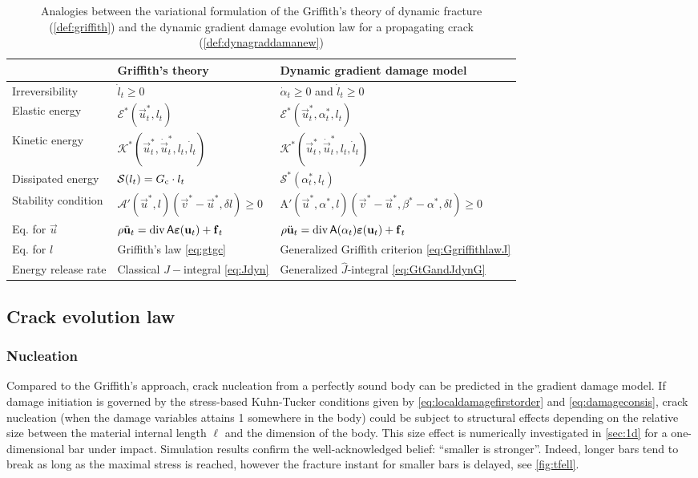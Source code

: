 \begin{table}[htbp]
\caption{Analogies between the variational formulation of the Griffith's theory of dynamic fracture (\cref{def:griffith}) and the dynamic gradient damage evolution law for a propagating crack (\cref{def:dynagraddamanew})} \label{tab:analogy}
\centering
\begin{tabular}{lll} \toprule
 & Griffith's theory & Dynamic gradient damage model \\ \midrule
Irreversibility & $\dot{l}_t\geq 0$ & $\dot{\alpha}_t\geq 0$ and $\dot{l}_t\geq 0$ \\
Elastic energy & $\mathcal{E}^*(\vec{u}^*_t,l_t)$ & $\mathcal{E}^*(\vec{u}^*_t,\alpha^*_t,l_t)$ \\
Kinetic energy & $\mathcal{K}^*(\vec{u}_t^*,\dot{\vec{u}}_t^*,l_t,\dot{l}_t)$ & $\mathcal{K}^*(\vec{u}_t^*,\dot{\vec{u}}_t^*,l_t,\dot{l}_t)$ \\
Dissipated energy & $\mathcal{S}(l_t)=G_\mathrm{c}\cdot l_t$ & $\mathcal{S}^*(\alpha^*_t,l_t)$ \\
Stability condition & $\mathcal{A}'(\vec{u}^*,l)(\vec{v}^*-\vec{u}^*,\delta l)\geq 0$ & $\mathrm{A}'(\vec{u}^*,\alpha^*,l)(\vec{v}^*-\vec{u}^*,\beta^*-\alpha^*,\delta l)\geq 0$ \\
Eq. for $\vec{u}$ & $\rho\ddot{\vec{u}}_t=\div\tens{A}\eps(\vec{u}_t)+\vec{f}_t$ & $\rho\ddot{\vec{u}}_t=\div\tens{A}(\alpha_t)\eps(\vec{u}_t)+\vec{f}_t$ \\
Eq. for $l$ & Griffith's law \eqref{eq:gtgc} & Generalized Griffith criterion \eqref{eq:GgriffithlawJ} \\
Energy release rate & Classical $J-$integral \eqref{eq:Jdyn} & Generalized $\widehat{J}$-integral \eqref{eq:GtGandJdynG} \\ \bottomrule
\end{tabular}
\end{table}

\subsection{Crack evolution law} \label{sec:phases}
\subsubsection{Nucleation}
Compared to the Griffith's approach, crack nucleation from a perfectly sound body can be predicted in the gradient damage model. If damage initiation is governed by the stress-based Kuhn-Tucker conditions given by \eqref{eq:localdamagefirstorder} and \eqref{eq:damageconsis}, crack nucleation (when the damage variables attains 1 somewhere in the body) could be subject to structural effects depending on the relative size between the material internal length $\ell$ and the dimension of the body. This size effect is numerically investigated in \cref{sec:1d} for a one-dimensional bar under impact. Simulation results confirm the well-acknowledged belief: ``smaller is stronger''. Indeed, longer bars tend to break as long as the maximal stress is reached, however the fracture instant for smaller bars is delayed, see \cref{fig:tfell}.

